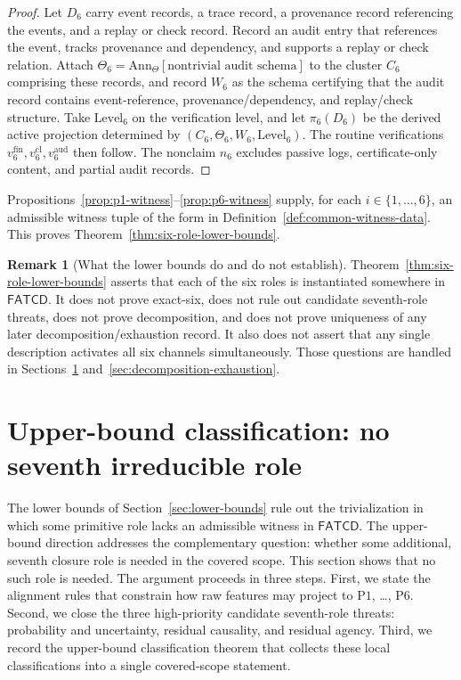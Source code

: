 \documentclass[11pt]{article}
\theoremstyle{definition}
\newtheorem{remark}[theorem]{Remark}
\newcommand{\FATCD}{\ensuremath{\mathsf{FATCD}}}
\newcommand{\Pone}{\ensuremath{\mathrm{P1}}}
\newcommand{\Psix}{\ensuremath{\mathrm{P6}}}
\begin{document}
\begin{proof}
Let \(D_6\) carry event records, a trace record, a provenance record
referencing the events, and a replay or check record. Record an audit
entry that references the event, tracks provenance and dependency, and
supports a replay or check relation. Attach
\(\Theta_6 = \mathrm{Ann}_\Theta[\text{nontrivial audit schema}]\) to
the cluster \(C_6\) comprising these records, and record \(W_6\) as the
schema certifying that
the audit record contains event-reference, provenance/dependency, and
replay/check structure. Take \(\mathrm{Level}_6\) on the verification
level, and let \(\pi_6(D_6)\) be the derived active projection
determined by \((C_6,\Theta_6,W_6,\mathrm{Level}_6)\). The routine
verifications \(v_6^{\mathrm{fin}}, v_6^{\mathrm{cl}},
v_6^{\mathrm{aud}}\) then follow. The nonclaim \(n_6\) excludes passive
logs, certificate-only content, and partial audit records.
\end{proof}

Propositions~\ref{prop:p1-witness}--\ref{prop:p6-witness} supply, for
each \(i \in \{1,\ldots,6\}\), an admissible witness tuple of the
form in Definition~\ref{def:common-witness-data}. This proves
Theorem~\ref{thm:six-role-lower-bounds}.

\begin{remark}[What the lower bounds do and do not establish]\label{rem:lower-bounds-scope}
Theorem~\ref{thm:six-role-lower-bounds} asserts that each of the six
roles is instantiated somewhere in \FATCD{}. It does not prove
exact-six, does not rule out candidate seventh-role threats, does not
prove decomposition, and does not prove uniqueness of any later
decomposition/exhaustion record. It also does not assert that any
single description activates all six channels simultaneously. Those
questions are handled in
Sections~\ref{sec:upper-bound-classification}
and~\ref{sec:decomposition-exhaustion}.
\end{remark}
 \section{Upper-bound classification: no seventh irreducible role}\label{sec:upper-bound-classification}




The lower bounds of Section~\ref{sec:lower-bounds} rule out the
trivialization in which some primitive role lacks an admissible
witness in \FATCD{}. The upper-bound direction addresses the
complementary question: whether some additional, seventh closure role
is needed in the covered scope. This section shows that no such role
is needed. The argument proceeds in three steps. First, we state the
alignment rules that constrain how raw features may project to
\Pone{}, \ldots, \Psix{}. Second, we close the three high-priority
candidate seventh-role threats: probability and uncertainty, residual
causality, and residual agency. Third, we record the upper-bound
classification theorem that collects these local classifications into
a single covered-scope statement.
\end{document}
